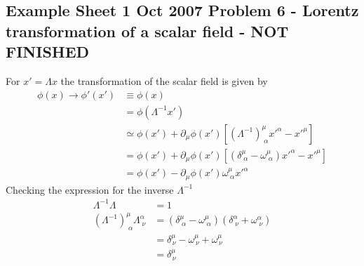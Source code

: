 \documentclass[../main.tex]{subfiles}
\begin{document}
\subsection{Example Sheet 1 Oct 2007 Problem 6 - Lorentz transformation of a scalar field - NOT FINISHED}
For $x'=\Lambda x$ the transformation of the scalar field is given by
\begin{align}
\phi(x)\rightarrow\phi'(x')
&\equiv\phi(x)\\
&=\phi(\Lambda^{-1}x')\\
&\simeq\phi(x')+\partial_\mu\phi(x')[(\Lambda^{-1})^\mu_{\;\alpha}x'^\alpha-x'^\mu]\\
&=\phi(x')+\partial_\mu\phi(x')[(\delta^\mu_{\;\alpha}-\omega^\mu_{\;\alpha})x'^\alpha-x'^\mu]\\
&=\phi(x')-\partial_\mu\phi(x')\omega^\mu_{\;\alpha}x'^\alpha
\end{align}
Checking the expression for the inverse $\Lambda^{-1}$
\begin{align}
\Lambda^{-1}\Lambda&=1\\
(\Lambda^{-1})^\mu_{\;\alpha}\Lambda^\alpha_{\;\nu}&=(\delta^\mu_{\;\alpha}-\omega^\mu_{\;\alpha})(\delta^\alpha_{\;\nu}+\omega^\alpha_{\;\nu})\\
&=\delta^\mu_{\,\nu}-\omega^\mu_{\,\nu}+\omega^\mu_{\,\nu}\\
&=\delta^\mu_{\,\nu}
\end{align}
\end{document}

